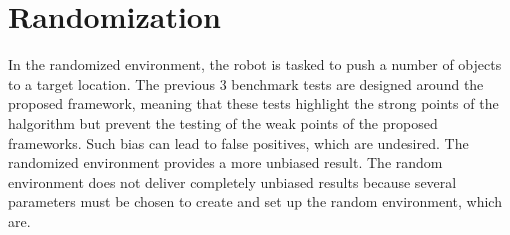 %
%
%
%

\section{Randomization}%
\label{sec:randomisation}
In the randomized environment, the robot is tasked to push a number of objects to a target location. The previous 3 benchmark tests are designed around the proposed framework, meaning that these tests highlight the strong points of the \ac{halgorithm} but prevent the testing of the weak points of the proposed frameworks. Such bias can lead to false positives, which are undesired. The randomized environment provides a more unbiased result. The random environment does not deliver completely unbiased results because several parameters must be chosen to create and set up the random environment, which are.\\

